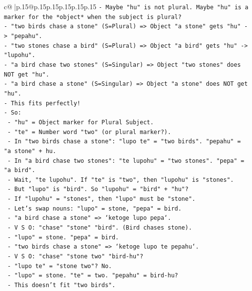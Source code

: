 \documentclass{article}
\begin{document}
{\begin{supertabular}{c@{$\;$}|p{.15\linewidth}@{}p{.15\linewidth}p{.15\linewidth}p{.15\linewidth}p{.15\linewidth}p{.15\linewidth}}
{{{\texttt{{-} Maybe "hu" is not plural. Maybe "hu" is a marker for the *object* when the subject is plural?} \\
\texttt{{-} "two birds chase a stone" (S=Plural) => Object "a stone" gets "hu" {-}> "pepahu".} \\
\texttt{{-} "two stones chase a bird" (S=Plural) => Object "a bird" gets "hu" {-}> "lupohu".} \\
\texttt{{-} "a bird chase two stones" (S=Singular) => Object "two stones" does NOT get "hu".} \\
\texttt{{-} "a bird chase a stone" (S=Singular) => Object "a stone" does NOT get "hu".} \\
\texttt{{-} This fits perfectly!} \\
\texttt{{-} So:} \\
\texttt{  {-} "hu" = Object marker for Plural Subject.} \\
\texttt{  {-} "te" = Number word "two" (or plural marker?).} \\
\texttt{  {-} In "two birds chase a stone": "lupo te" = "two birds". "pepahu" = "a stone" + hu.} \\
\texttt{  {-} In "a bird chase two stones": "te lupohu" = "two stones". "pepa" = "a bird".} \\
\texttt{    {-} Wait, "te lupohu". If "te" is "two", then "lupohu" is "stones".} \\
\texttt{    {-} But "lupo" is "bird". So "lupohu" = "bird" + "hu"?} \\
\texttt{    {-} If "lupohu" = "stones", then "lupo" must be "stone".} \\
\texttt{    {-} Let's swap nouns: "lupo" = stone, "pepa" = bird.} \\
\texttt{    {-} "a bird chase a stone" => `ketoge lupo pepa`.} \\
\texttt{      {-} V S O: "chase" "stone" "bird". (Bird chases stone).} \\
\texttt{      {-} "lupo" = stone. "pepa" = bird.} \\
\texttt{    {-} "two birds chase a stone" => `ketoge lupo te pepahu`.} \\
\texttt{      {-} V S O: "chase" "stone two" "bird{-}hu"?} \\
\texttt{      {-} "lupo te" = "stone two"? No.} \\
\texttt{      {-} "lupo" = stone. "te" = two. "pepahu" = bird{-}hu?} \\
\texttt{      {-} This doesn't fit "two birds".} \\
\\ 
}}}
\end{supertabular}}
\end{document}
